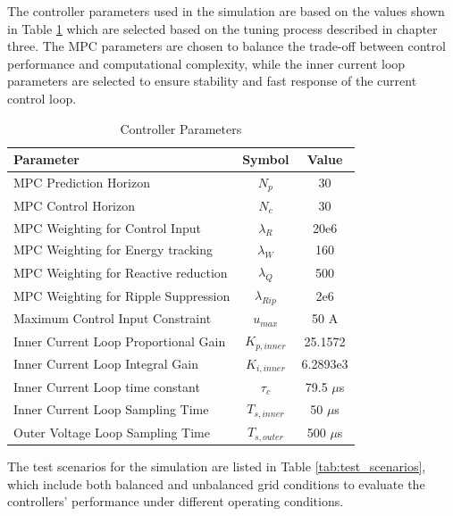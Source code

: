 The controller parameters used in the simulation are based on the values shown in Table \ref{tab:controller_parameters} which
are selected based on the tuning process described in chapter three. The MPC parameters are chosen to balance the trade-off 
between control performance and computational complexity, while the inner current loop parameters are selected to ensure stability
and fast response of the current control loop.\par
\vspace{1cm}
\begin{table}[htbp]
    \centering
    \caption{Controller Parameters}
    \begin{tabular}{|l|c|c|}
        \hline
        \textbf{Parameter} & \textbf{Symbol} & \textbf{ Value} \\ \hline
        MPC Prediction Horizon & $N_p$ & 30 \\ \hline
        MPC Control Horizon & $N_c$ & 30 \\ \hline
        MPC Weighting for Control Input & $\lambda_R$ & 20e6 \\ \hline
        MPC Weighting for Energy tracking & $\lambda_{W}$ & 160 \\ \hline
        MPC Weighting for Reactive reduction & $\lambda_{Q}$ & 500 \\ \hline
        MPC Weighting for Ripple Suppression & $\lambda_{Rip}$ & 2e6 \\ \hline
        Maximum Control Input Constraint & $u_{max}$ & 50 A \\ \hline
        Inner Current Loop Proportional Gain & $K_{p,inner}$ & 25.1572 \\ \hline
        Inner Current Loop Integral Gain & $K_{i,inner}$ & 6.2893e3 \\ \hline
        Inner Current Loop time constant & $\tau_{c}$ & 79.5 $\mu$s \\ \hline
        Inner Current Loop Sampling Time & $T_{s,inner}$ & 50 $\mu$s \\ \hline
        Outer Voltage Loop Sampling Time & $T_{s,outer}$ & 500 $\mu$s \\ \hline
    \end{tabular}
    \label{tab:controller_parameters}
\end{table}
\vspace{1cm}
The test scenarios for the simulation are listed in Table \ref{tab:test_scenarios}, which include both balanced and unbalanced 
grid conditions to evaluate the controllers' performance under different operating conditions.\par
